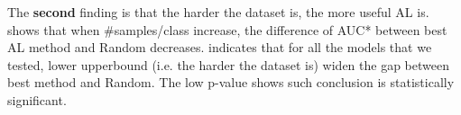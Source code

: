 

The \textbf{second} finding is that the harder the dataset is, the more useful AL is.  shows that when \#samples/class increase, the difference of AUC* between best AL method and Random decreases.  indicates that for all the models that we tested, lower upperbound (i.e. the harder the dataset is) widen the gap between best method and Random. The low p-value shows such conclusion is statistically significant.


